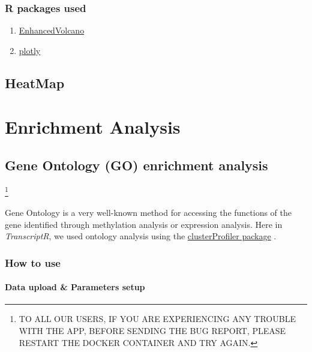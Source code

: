 \documentclass[
  a4paper,
  oneside,
  open=any]{scrreport}
\providecommand{\tightlist}{%
  \setlength{\itemsep}{0pt}\setlength{\parskip}{0pt}}\usepackage{longtable,booktabs,array}
\begin{document}
\hypertarget{r-packages-used-1}{%
\section{R packages used}\label{r-packages-used-1}}

\begin{enumerate}
\def\labelenumi{\arabic{enumi}.}
\tightlist
\item
  \href{}{EnhancedVolcano}
\item
  \href{https://cran.r-project.org/web/packages/plotly/plotly.pdf}{plotly}
\end{enumerate}

\hypertarget{heatmap}{%
\chapter{HeatMap}\label{heatmap}}

\part{Enrichment Analysis}

\hypertarget{sec-go}{%
\chapter{Gene Ontology (GO) enrichment analysis}\label{sec-go}}

\footnote{TO ALL OUR USERS, IF YOU ARE EXPERIENCING ANY TROUBLE WITH THE
  APP, BEFORE SENDING THE BUG REPORT, PLEASE RESTART THE DOCKER
  CONTAINER AND TRY AGAIN.}

Gene Ontology is a very well-known method for accessing the functions of
the gene identified through methylation analysis or expression analysis.
Here in \emph{TranscriptR}, we used ontology analysis using the
\href{https://bioconductor.org/packages/release/bioc/html/clusterProfiler.html}{clusterProfiler
package} \autocite{yu2012clusterprofiler,wu2021clusterprofiler}.

\hypertarget{how-to-use-4}{%
\section{How to use}\label{how-to-use-4}}

\hypertarget{data-upload-parameters-setup}{%
\subsection{Data upload \& Parameters
setup}\label{data-upload-parameters-setup}}
\end{document}
